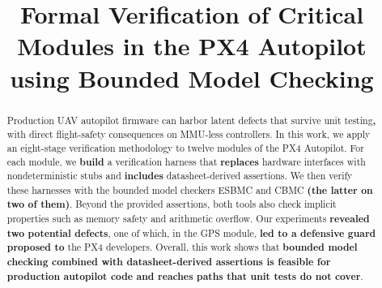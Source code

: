 \documentclass[conference]{IEEEtran}
\begin{document}
\title{Formal Verification of Critical Modules in the PX4 Autopilot
       using Bounded Model Checking\\
}


\author{
\and
{}
\and
{}
}

\maketitle

\begin{abstract}
Production UAV autopilot firmware can harbor latent defects that survive
unit testing\textbf{,} with direct flight-safety consequences on MMU-less
controllers. In this work, we apply an eight-stage verification methodology
to twelve modules of the PX4 Autopilot. For each module, we \textbf{build}
a verification harness that \textbf{replaces} hardware interfaces with
nondeterministic stubs and \textbf{includes} datasheet-derived assertions.
We then verify these harnesses with the bounded model checkers ESBMC and
CBMC \textbf{(the latter on two of them)}. Beyond the provided assertions,
both tools also check implicit properties such as memory safety and
arithmetic overflow. Our experiments \textbf{revealed two potential defects},
one of which, in the GPS module, \textbf{led to a defensive guard proposed to}
the PX4 developers. Overall, this work shows that \textbf{bounded model
checking combined with datasheet-derived assertions is feasible for
production autopilot code and reaches paths that unit tests do not cover}.
\end{abstract}
\end{document}
